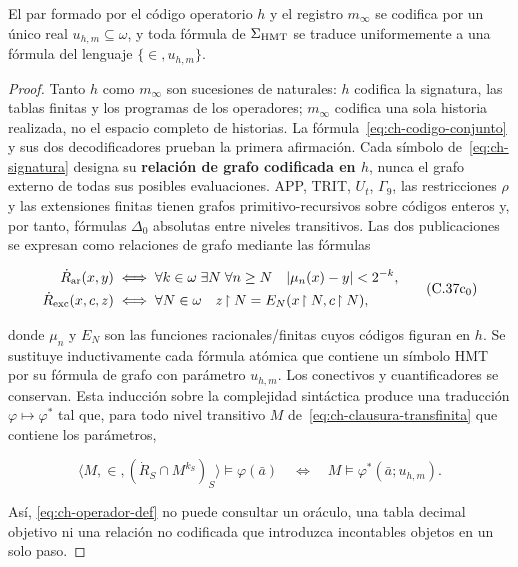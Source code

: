\begin{lemma}
\label{thm:ch-6}
El par formado por
el código operatorio \(h\) y el registro \(m_\infty\) se codifica por un único
real \(u_{h,m}\subseteq\omega\), y toda fórmula de \(\Sigma_{\rm HMT}\) se
traduce uniformemente a una fórmula del lenguaje \(\{\in,u_{h,m}\}\).

\end{lemma}
\begin{proof}
Tanto \(h\) como \(m_\infty\) son sucesiones de naturales: \(h\)
codifica la signatura, las tablas finitas y los programas de los operadores;
\(m_\infty\) codifica una sola historia realizada, no el espacio completo de
historias. La fórmula~\eqref{eq:ch-codigo-conjunto} y sus dos decodificadores prueban la primera
afirmación. Cada símbolo de~\eqref{eq:ch-signatura} designa su \textbf{relación de grafo codificada en \(h\)}, nunca el grafo externo de todas sus posibles evaluaciones. APP,
TRIT, \(U_t\), \(\Gamma_9\), las restricciones \(\rho\) y las extensiones
finitas tienen grafos primitivo-recursivos sobre códigos enteros y, por tanto,
fórmulas \(\Delta_0\) absolutas entre niveles transitivos. Las dos
publicaciones se expresan como relaciones de grafo mediante las fórmulas

\[
 \begin{aligned}
 \dot R_{\rm ar}(x,y)
 &\;\Longleftrightarrow\;
 \forall k\in\omega\;\exists N\;\forall n\ge N\quad
 |\mu_n(x)-y|<2^{-k},\\
 \dot R_{\rm exc}(x,c,z)
 &\;\Longleftrightarrow\;
 \forall N\in\omega\quad z\!\upharpoonright N
   =E_N(x\!\upharpoonright N,c\!\upharpoonright N),
 \end{aligned}
\tag{C.37c$_0$}\label{eq:ch-grafos-publicacion}
\]

donde \(\mu_n\) y \(E_N\) son las funciones racionales/finitas cuyos códigos
figuran en \(h\). Se sustituye inductivamente cada fórmula atómica que contiene
un símbolo HMT por su fórmula de grafo con parámetro \(u_{h,m}\). Los
conectivos y cuantificadores se conservan. Esta inducción sobre la complejidad
sintáctica produce una traducción \(\varphi\mapsto\varphi^*\) tal que, para
todo nivel transitivo \(M\) de~\eqref{eq:ch-clausura-transfinita} que contiene los parámetros,

\[
 \langle M,\in,(\dot R_S\cap M^{k_S})_S\rangle
   \models\varphi(\bar a)
 \quad\Longleftrightarrow\quad
 M\models\varphi^*(\bar a;u_{h,m}).
\tag{C.37c}\label{eq:ch-eliminacion-uniforme}
\]

Así, \eqref{eq:ch-operador-def} no puede consultar un oráculo, una tabla decimal objetivo ni una
relación no codificada que introduzca incontables objetos en un solo paso.
\end{proof}


